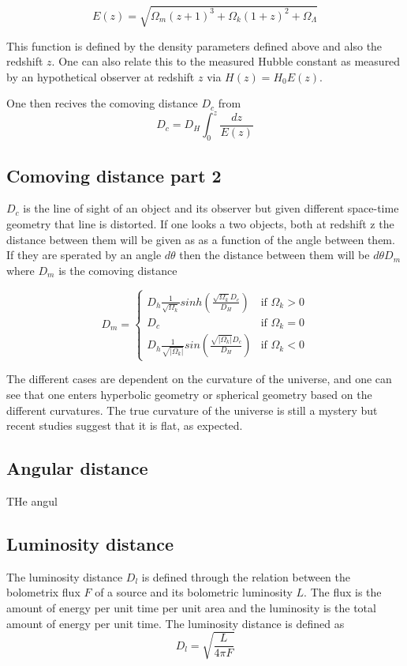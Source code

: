 \documentclass[11pt]{article}
\begin{document}
\begin{equation}
    E(z)  = \sqrt{\Omega_m(z+1)^3 +\Omega_k (1+z)^2 + \Omega_\Lambda  }
\end{equation}


This function is defined by the density parameters defined above and also the redshift $z$. One can also relate this to the measured Hubble constant as measured by an hypothetical observer at redshift $z$ via $ H(z) = H_0 E(z)$. 


One then recives the comoving distance $D_c$ from 
\begin{equation}
    D_c =D_H \int_0^z\frac{dz}{E(z)}
\end{equation}
\subsection{Comoving distance part 2}
$D_c$ is the line of sight of an object and its observer but given different space-time geometry that line is distorted. If one looks a two objects, both at redshift z the distance between them will be given as as a function of the angle between them. If they are sperated by an angle $d\theta$ then the distance between them will be $d\theta D_m$ where $D_m$ is the comoving distance


$$
D_m =
\begin{cases}
  D_h\frac{1}{\sqrt{\Omega_k}}sinh(\frac{\sqrt{\Omega_k}D_c}{D_H}) & \text{if } \Omega_k > 0 \\
  D_c& \text{if } \Omega_k = 0 \\
  D_h\frac{1}{\sqrt{|\Omega_k|}}sin(\frac{\sqrt{|\Omega_k|}D_c}{D_H}) & \text{if } \Omega_k < 0
\end{cases}
$$

The different cases are dependent on the curvature of the universe, and one can see that one enters hyperbolic geometry or spherical geometry based on the different curvatures. The true curvature of the universe is still a mystery but recent studies suggest that it is flat, as expected. 


\subsection{Angular distance}


THe angul


\subsection{Luminosity distance}
The luminosity distance $D_l$ is defined through the relation between 
the bolometrix flux $F$ of a source and its bolometric luminosity $L$. 
The flux is the amount of energy per unit time per unit area and the luminosity is the total amount of energy per unit time. 
The luminosity distance is defined as
\begin{equation}
    D_l = \sqrt{\frac{L}{4\pi F}}
\end{equation}
\end{document}
